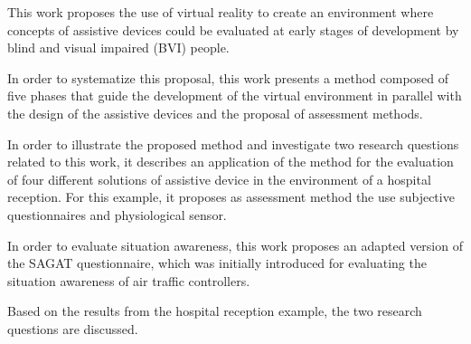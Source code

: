 



This work proposes the use of virtual reality to create an environment where concepts of assistive devices could be evaluated at early stages of development by blind and visual impaired (BVI) people.

In order to systematize this proposal, this work presents a method composed of five phases that guide the development of the virtual environment in parallel with the design of the assistive devices and the proposal of assessment methods.

In order to illustrate the proposed method and investigate two research questions related to this work, it describes an application of the method for the evaluation of four different solutions of assistive device in the environment of a hospital reception. For this example, it proposes as assessment method the use subjective questionnaires and physiological sensor. 

In order to evaluate situation awareness, this work proposes an adapted version of the SAGAT questionnaire, which was initially introduced for evaluating the situation awareness of air traffic controllers. 

Based on the results from the hospital reception example, the two research questions are discussed.



